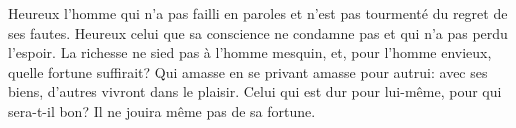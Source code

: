 Heureux l’homme qui n’a pas failli en paroles
	et n’est pas tourmenté du regret de ses fautes.
Heureux celui que sa conscience ne condamne pas et qui n’a pas perdu l’espoir.
La richesse ne sied pas à l’homme mesquin,
	et, pour l’homme envieux, quelle fortune suffirait?
Qui amasse en se privant amasse pour autrui:
	avec ses biens, d’autres vivront dans le plaisir.
Celui qui est dur pour lui-même, pour qui sera-t-il bon?
	Il ne jouira même pas de sa fortune.

